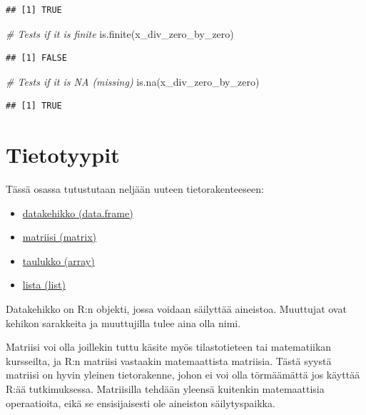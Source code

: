 \documentclass[
]{book}
\newenvironment{Shaded}{\begin{snugshade}}{\end{snugshade}}
\newcommand{\CommentTok}[1]{\textcolor[rgb]{0.56,0.35,0.01}{\textit{#1}}}
\newcommand{\FunctionTok}[1]{\textcolor[rgb]{0.00,0.00,0.00}{#1}}
\newcommand{\NormalTok}[1]{#1}
\providecommand{\tightlist}{%
  \setlength{\itemsep}{0pt}\setlength{\parskip}{0pt}}
\begin{document}
\begin{verbatim}
## [1] TRUE
\end{verbatim}

\begin{Shaded}
\begin{Highlighting}[]
\CommentTok{\# Tests if it is finite}
\FunctionTok{is.finite}\NormalTok{(x\_div\_zero\_by\_zero)}
\end{Highlighting}
\end{Shaded}

\begin{verbatim}
## [1] FALSE
\end{verbatim}

\begin{Shaded}
\begin{Highlighting}[]
\CommentTok{\# Tests if it is NA (missing)}
\FunctionTok{is.na}\NormalTok{(x\_div\_zero\_by\_zero)}
\end{Highlighting}
\end{Shaded}

\begin{verbatim}
## [1] TRUE
\end{verbatim}

\hypertarget{data_types}{%
\chapter{Tietotyypit}\label{data_types}}

Tässä osassa tutustutaan neljään uuteen tietorakenteeseen:

\begin{itemize}
\tightlist
\item
  \protect\hyperlink{data-frame}{datakehikko (data.frame)}
\item
  \protect\hyperlink{matrix}{matriisi (matrix)}
\item
  \protect\hyperlink{array}{taulukko (array)}
\item
  \protect\hyperlink{list}{lista (list)}
\end{itemize}

Datakehikko on R:n objekti, jossa voidaan säilyttää aineistoa. Muuttujat ovat kehikon sarakkeita ja muuttujilla tulee aina olla nimi.

Matriisi voi olla joillekin tuttu käsite myös tilastotieteen tai matematiikan kursseilta, ja R:n matriisi vastaakin matemaattista matriisia. Tästä syystä matriisi on hyvin yleinen tietorakenne, johon ei voi olla törmäämättä jos käyttää R:ää tutkimuksessa. Matriisilla tehdään yleensä kuitenkin matemaattisia operaatioita, eikä se ensisijaisesti ole aineiston säilytyspaikka.
\end{document}
